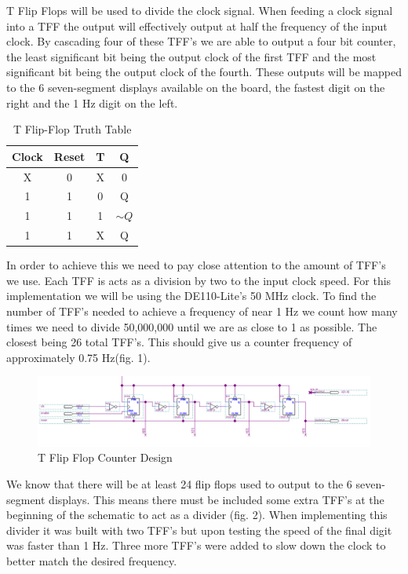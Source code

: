\documentclass{article}
\begin{document}
T Flip Flops will be used to divide the clock signal. When feeding a clock signal into a TFF the output will effectively output at half the frequency of the input clock. By cascading four of these TFF's we are able to output a four bit counter, the least significant bit being the output clock of the first TFF and the most significant bit being the output clock of the fourth. These outputs will be mapped to the 6 seven-segment displays available on the board, the fastest digit on the right and the 1 Hz digit on the left.

\begin{table}[H]
  \centering
  \begin{tabular}{|c|c|c||c|}
  \hline
  \textbf{Clock} & \textbf{Reset} & \textbf{T} & \textbf{Q} \\
  \hline
  X & 0 & X & 0 \\
  \hline
  1 & 1 & 0 & Q \\
  \hline
  1 & 1 & 1 & $\sim Q$ \\
  \hline
  1 & 1 & X & Q \\
  \hline
  \end{tabular}
  \caption{T Flip-Flop Truth Table}
\end{table}
  
In order to achieve this we need to pay close attention to the amount of TFF's we use. Each TFF is acts as a division by two to the input clock speed. For this implementation we will be using the DE110-Lite's 50 MHz clock. To find the number of TFF's needed to achieve a frequency of near 1 Hz we count how many times we need to divide 50,000,000 until we are as close to 1 as possible. The closest being 26 total TFF's. This should give us a counter frequency of approximately 0.75 Hz(fig. 1). 

\begin{figure}[H]
  \centering
  \includegraphics*[width=1\linewidth]{counter.png}
  \caption{T Flip Flop Counter Design}  
\end{figure}

We know that there will be at least 24 flip flops used to output to the 6 seven-segment displays. This means there must be included some extra TFF's at the beginning of the schematic to act as a divider (fig. 2). When implementing this divider it was built with two TFF's but upon testing the speed of the final digit was faster than 1 Hz. Three more TFF's were added to slow down the clock to better match the desired frequency.
\end{document}
